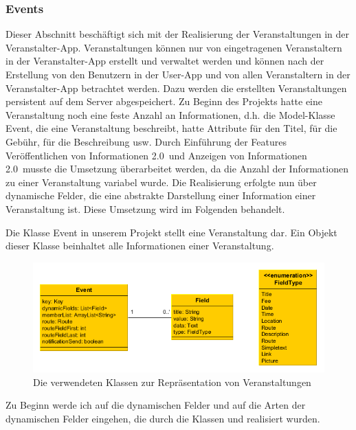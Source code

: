 \subsubsection{Events}
\label{sec:events}
Dieser Abschnitt beschäftigt sich mit der Realisierung der Veranstaltungen in der Veranstalter-App. Veranstaltungen können nur von eingetragenen Veranstaltern in der Veranstalter-App erstellt und verwaltet werden und können nach der Erstellung von den Benutzern in der User-App und von allen Veranstaltern in der Veranstalter-App betrachtet werden. Dazu werden die erstellten Veranstaltungen persistent auf dem Server abgespeichert. Zu Beginn des Projekts hatte eine Veranstaltung noch eine feste Anzahl an Informationen, d.h. die Model-Klasse \glqq Event\grqq, die eine Veranstaltung beschreibt, hatte Attribute für den Titel, für die Gebühr, für die Beschreibung usw. Durch Einführung der Features \glqq Veröffentlichen von Informationen 2.0\grqq\ und \glqq Anzeigen von Informationen 2.0\grqq\ musste die Umsetzung überarbeitet werden, da die Anzahl der Informationen zu einer Veranstaltung variabel wurde. Die Realisierung erfolgte nun über dynamische Felder, die eine abstrakte Darstellung einer Information einer Veranstaltung ist. Diese Umsetzung wird im Folgenden behandelt.

Die Klasse Event in unserem Projekt stellt eine Veranstaltung dar. Ein Objekt dieser Klasse beinhaltet alle Informationen einer Veranstaltung.

\begin{figure}[htb]
\centering
\includegraphics[width=\textwidth]{graphics/Model_Klassen.png}
\caption{Die verwendeten Klassen zur Repräsentation von Veranstaltungen}
\label{fig:modelEvents}
\end{figure}

Zu Beginn werde ich auf die dynamischen Felder und auf die Arten der dynamischen Felder eingehen, die durch die Klassen  und  realisiert wurden.

